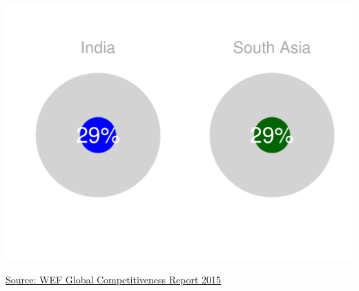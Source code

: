 \documentclass{article}\usepackage[]{graphicx}\usepackage[]{color}
\makeatletter
\def\maxwidth{ %
  \ifdim\Gin@nat@width>\linewidth
    \linewidth
  \else
    \Gin@nat@width
  \fi
}
\makeatother
\begin{document}
\begin{minipage}[b]{0.875\textwidth}
\begin{minipage}[c]{0.50\textwidth}
{\centering \includegraphics[width=\maxwidth]{figure/pie_chart_double_Human-1} 

}



    \vspace*{-1cm} 
    \hspace*{0.3cm} \raggedright\footnotesize{\href{http://www.weforum.org/global-competitiveness-report-2015-2016}{Source: WEF Global Competitiveness Report 2015}}
  \end{minipage}
\end{minipage}  

{\color{blue!50!white}\noindent\makebox[\linewidth]{\rule{18cm}{0.3pt}}} %

\end{document}
